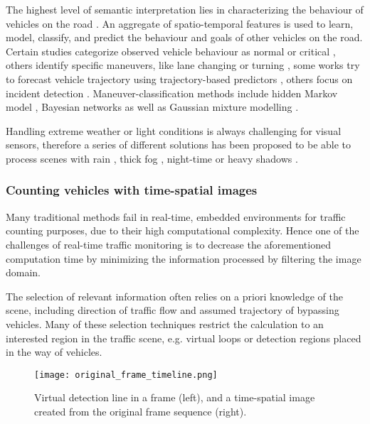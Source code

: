 The highest level of semantic interpretation lies in characterizing the behaviour of vehicles on the road \cite{Sivaraman2013}.
An aggregate of spatio-temporal features is used to learn, model, classify, and predict the behaviour and goals of other vehicles on the road.
Certain studies categorize observed vehicle behaviour as normal or critical \cite{Cherng2009}, others identify specific maneuvers, like lane changing or turning \cite{Garcia2012}, some works try to forecast vehicle trajectory using trajectory-based predictors \cite{Hermes2009}, others focus on incident detection \cite{Kamijo2004}.
Maneuver-classification methods include hidden Markov model \cite{Sivaraman2011}, Bayesian networks \cite{Kasper2012} as well as Gaussian mixture modelling \cite{Wiest2012}.

Handling extreme weather or light conditions is always challenging for visual sensors, therefore a series of different solutions has been proposed to be able to process scenes with rain \cite{Yu2015,Barnum2010}, thick fog \cite{Zhou2014a,Tarel2009}, night-time \cite{Bi2009, Robert2009} or heavy shadows \cite{Kamkar2016, Miller2015}.

\subsubsection{Counting vehicles with time-spatial images}
Many traditional methods fail in real-time, embedded environments for traffic counting purposes, due to their high computational complexity.
Hence one of the challenges of real-time traffic monitoring is to decrease the aforementioned computation time by minimizing the information processed by filtering the image domain.

The selection of relevant information often relies on a priori knowledge of the scene, including direction of traffic flow and assumed trajectory of bypassing vehicles.
Many of these selection techniques restrict the calculation to an interested region in the traffic scene, e.g. virtual loops \cite{Tursun2013a, He2008} or detection regions \cite{Miller2015, Engel2016} placed in the way of vehicles.

\begin{figure}[!h]
	\centering
	\texttt{[image: original\_frame\_timeline.png]}
	\caption[Virtual detection line and time-spatial image]{Virtual detection line in a frame (left), and a time-spatial image created from the original frame sequence (right).\label{fig:TSI}}
\end{figure}

